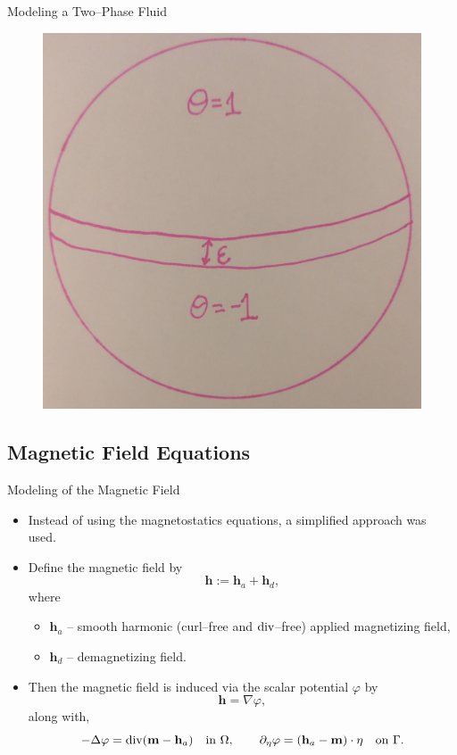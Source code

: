 \documentclass[9pt]{beamer}
\newcommand{\grad}{\nabla}
\newcommand{\diverg}{\textup{div} }
\newcommand{\lap}{\Delta}
\begin{document}
\begin{frame}{Modeling a Two--Phase Fluid}
\begin{itemize}
\begin{minipage}{.3\paperwidth}
\begin{figure}[!b]
			\includegraphics[scale=.05]{CahnHilliard.jpg}
		\end{figure}
	\end{minipage}%
\end{itemize}
\end{frame}

\subsection{Magnetic Field Equations}
\begin{frame}{Modeling of the Magnetic Field}
\begin{itemize}
	\item Instead of using the magnetostatics equations, a simplified approach was used.
	\item Define the magnetic field by 
	$$
		\mathbf{h} := \mathbf{h}_a + \mathbf{h}_d,
	$$
	where 
	\begin{itemize}
		\item $\mathbf{h}_a$ -- smooth harmonic (curl--free and $\diverg$--free) applied magnetizing field,
		\item $\mathbf{h}_d$ -- demagnetizing field.
	\end{itemize}
	\item Then the magnetic field is induced via the scalar potential $\varphi$ by
	$$
		\mathbf{h} = \grad\varphi,
	$$
	along with,
	$$
		-\lap \varphi =\diverg(\mathbf{m}-\mathbf{h}_a) \quad \text{in }\Omega,\quad \quad \partial_\eta\varphi = (\mathbf{h}_a - \mathbf{m})\cdot\eta \quad \text{on }\Gamma.
	$$
\end{itemize}
\end{frame}
\end{document}
